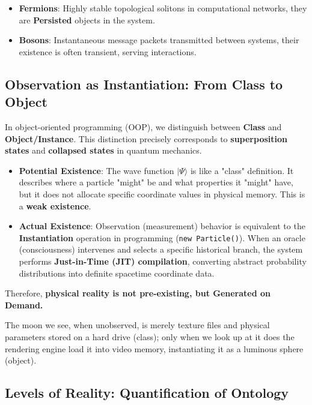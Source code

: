 \begin{itemize}
\item \textbf{Fermions}: Highly stable topological solitons in computational networks, they are \textbf{Persisted} objects in the system.

\item \textbf{Bosons}: Instantaneous message packets transmitted between systems, their existence is often transient, serving interactions.
\end{itemize}

\subsection{Observation as Instantiation: From Class to Object}

In object-oriented programming (OOP), we distinguish between \textbf{Class} and \textbf{Object/Instance}. This distinction precisely corresponds to \textbf{superposition states} and \textbf{collapsed states} in quantum mechanics.

\begin{itemize}
\item \textbf{Potential Existence}: The wave function $|\Psi\rangle$ is like a "class" definition. It describes where a particle "might" be and what properties it "might" have, but it does not allocate specific coordinate values in physical memory. This is a \textbf{weak existence}.

\item \textbf{Actual Existence}: Observation (measurement) behavior is equivalent to the \textbf{Instantiation} operation in programming (\texttt{new Particle()}). When an oracle (consciousness) intervenes and selects a specific historical branch, the system performs \textbf{Just-in-Time (JIT) compilation}, converting abstract probability distributions into definite spacetime coordinate data.
\end{itemize}

Therefore, \textbf{physical reality is not pre-existing, but Generated on Demand.}

The moon we see, when unobserved, is merely texture files and physical parameters stored on a hard drive (class); only when we look up at it does the rendering engine load it into video memory, instantiating it as a luminous sphere (object).

\subsection{Levels of Reality: Quantification of Ontology}

